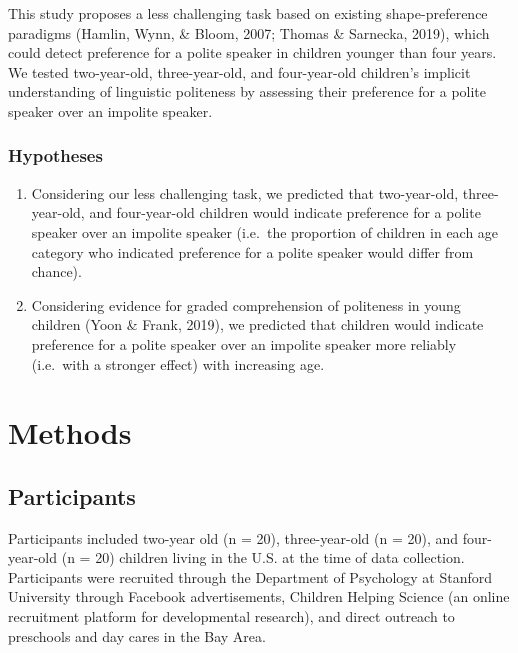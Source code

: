 \documentclass[
  english,
  man,floatsintext]{apa6}
\begin{document}
This study proposes a less challenging task based on existing shape-preference paradigms (Hamlin, Wynn, \& Bloom, 2007; Thomas \& Sarnecka, 2019), which could detect preference for a polite speaker in children younger than four years. We tested two-year-old, three-year-old, and four-year-old children's implicit understanding of linguistic politeness by assessing their preference for a polite speaker over an impolite speaker.

\hypertarget{hypotheses}{%
\subsubsection{Hypotheses}\label{hypotheses}}

\begin{enumerate}
\def\labelenumi{\arabic{enumi}.}
\item
  Considering our less challenging task, we predicted that two-year-old, three-year-old, and four-year-old children would indicate preference for a polite speaker over an impolite speaker (i.e.~the proportion of children in each age category who indicated preference for a polite speaker would differ from chance).
\item
  Considering evidence for graded comprehension of politeness in young children (Yoon \& Frank, 2019), we predicted that children would indicate preference for a polite speaker over an impolite speaker more reliably (i.e.~with a stronger effect) with increasing age.
\end{enumerate}

\hypertarget{methods}{%
\section{Methods}\label{methods}}

\hypertarget{participants}{%
\subsection{Participants}\label{participants}}

Participants included two-year old (n = 20), three-year-old (n = 20), and four-year-old (n = 20) children living in the U.S. at the time of data collection. Participants were recruited through the Department of Psychology at Stanford University through Facebook advertisements, Children Helping Science (an online recruitment platform for developmental research), and direct outreach to preschools and day cares in the Bay Area.
\end{document}
